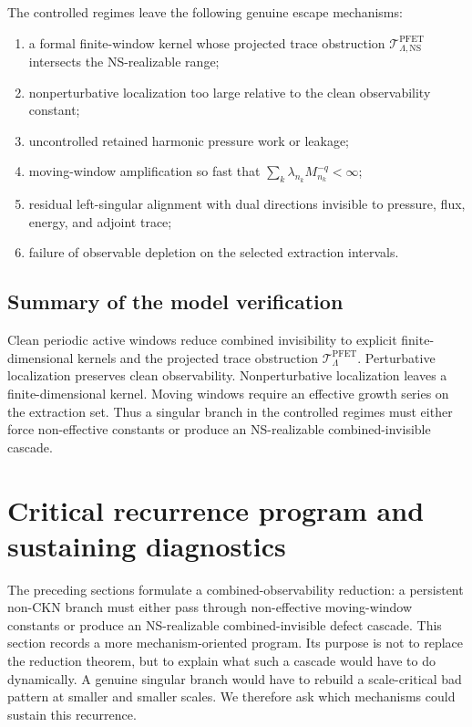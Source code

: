 \documentclass[11pt]{article}
\numberwithin{equation}{section}
\theoremstyle{plain}
\theoremstyle{definition}
\theoremstyle{remark}
\newcommand{\NS}{\mathrm{NS}}
\newcommand{\PFET}{\mathrm{PFET}}
\begin{document}
The controlled regimes leave the following genuine escape mechanisms:
\begin{enumerate}
\item a formal finite-window kernel whose projected trace obstruction
\(\mathcal T^{\PFET}_{\Lambda,\NS}\) intersects the NS-realizable range;
\item nonperturbative localization too large relative to the clean observability
constant;
\item uncontrolled retained harmonic pressure work or leakage;
\item moving-window amplification so fast that
\(\sum_k\lambda_{n_k}M_{n_k}^{-q}<\infty\);
\item residual left-singular alignment with dual directions invisible to
pressure, flux, energy, and adjoint trace;
\item failure of observable depletion on the selected extraction intervals.
\end{enumerate}

\subsection{Summary of the model verification}

Clean periodic active windows reduce combined invisibility to explicit
finite-dimensional kernels and the projected trace obstruction
\(\mathcal T^{\PFET}_\Lambda\).  Perturbative localization preserves clean
observability.  Nonperturbative localization leaves a finite-dimensional kernel.
Moving windows require an effective growth series on the extraction set.  Thus a
singular branch in the controlled regimes must either force non-effective
constants or produce an NS-realizable combined-invisible cascade.

\section{Critical recurrence program and sustaining diagnostics}
\label{sec:critical-recurrence-program}

The preceding sections formulate a combined-observability reduction: a persistent non-CKN branch must either pass through non-effective moving-window constants or produce an NS-realizable combined-invisible defect cascade.  This section records a more mechanism-oriented program.  Its purpose is not to replace the reduction theorem, but to explain what such a cascade would have to do dynamically.  A genuine singular branch would have to rebuild a scale-critical bad pattern at smaller and smaller scales.  We therefore ask which mechanisms could sustain this recurrence.
\end{document}
